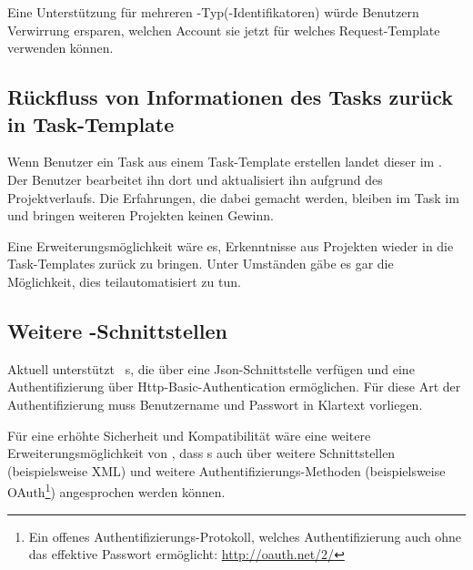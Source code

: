 			Eine Unterstützung für mehreren \ppt-Typ(-Identifikatoren) würde Benutzern Verwirrung ersparen,
			welchen Account sie jetzt für welches Request-Template verwenden können.
			
		\subsection{Rückfluss von Informationen des Tasks zurück in Task-Template}
		\label{subsec:informationFlowbackFeature}
			Wenn Benutzer ein Task aus einem Task-Template erstellen landet dieser im \ppt.
			Der Benutzer bearbeitet ihn dort und aktualisiert ihn aufgrund des Projektverlaufs.
			Die Erfahrungen, die dabei gemacht werden, bleiben im Task im \ppt
			und bringen weiteren Projekten keinen Gewinn.
			
			Eine Erweiterungsmöglichkeit wäre es,
			Erkenntnisse aus Projekten wieder in die Task-Templates zurück zu bringen.
			Unter Umständen gäbe es gar die Möglichkeit, dies teilautomatisiert zu tun.

		\subsection{Weitere \ppt-Schnittstellen}
		\label{subsec:morePPTInterfaces}
			Aktuell unterstützt \eeppi\ \ppt s, die über eine Json-Schnittstelle verfügen
			und eine Authentifizierung über Http-Basic-Authentication ermöglichen.
			Für diese Art der Authentifizierung muss Benutzername und Passwort in Klartext vorliegen.
			
			Für eine erhöhte Sicherheit und Kompatibilität wäre eine weitere Erweiterungsmöglichkeit von \eeppi,
			dass \ppt s auch über weitere Schnittstellen (beispielsweise XML)
			und weitere Authentifizierungs-Methoden (beispielsweise OAuth\footnote{Ein offenes Authentifizierungs-Protokoll, welches Authentifizierung auch ohne das effektive Passwort ermöglicht: \url{http://oauth.net/2/}}) angesprochen werden können.
			
